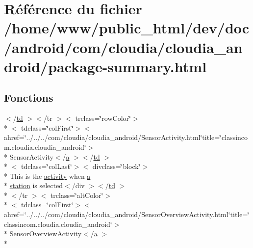 \hypertarget{com_2cloudia_2cloudia__android_2package-summary_8html}{\section{Référence du fichier /home/www/public\-\_\-html/dev/doc/android/com/cloudia/cloudia\-\_\-android/package-\/summary.html}
\label{com_2cloudia_2cloudia__android_2package-summary_8html}
}
\subsection*{Fonctions}
\begin{DoxyCompactItemize}
\item 
$<$/\hyperlink{stylesheet_8css_a2635d454965afd759ce151c6f6d1a04a}{td} $>$$<$/tr $>$$<$ trclass=\char`\"{}row\-Color\char`\"{}$>$\\*
$<$ tdclass=\char`\"{}col\-First\char`\"{}$>$$<$ ahref=\char`\"{}../../../com/cloudia/cloudia\-\_\-android/Sensor\-Activity.\-html\char`\"{}title=\char`\"{}classincom.\-cloudia.\-cloudia\-\_\-android\char`\"{}$>$\\*
 Sensor\-Activity$<$/\hyperlink{style_8css_a5e8981582017bb8b84c21f148345d1f7}{a} $>$$<$/\hyperlink{stylesheet_8css_a2635d454965afd759ce151c6f6d1a04a}{td} $>$\\*
$<$ tdclass=\char`\"{}col\-Last\char`\"{}$>$$<$ divclass=\char`\"{}block\char`\"{}$>$\\*
 This is the \hyperlink{_sensor_activity_8html_a27ce96cb0fb53311961cb30579c7f77e}{activity} when \hyperlink{style_8css_a5e8981582017bb8b84c21f148345d1f7}{a} \\*
\hyperlink{nav__app_8js_a71d7bfaa2081410e47cd5a835af1564d}{station} is selected$<$/div $>$$<$/\hyperlink{stylesheet_8css_a2635d454965afd759ce151c6f6d1a04a}{td} $>$\\*
$<$/tr $>$$<$ trclass=\char`\"{}alt\-Color\char`\"{}$>$\\*
$<$ tdclass=\char`\"{}col\-First\char`\"{}$>$$<$ ahref=\char`\"{}../../../com/cloudia/cloudia\-\_\-android/Sensor\-Overview\-Activity.\-html\char`\"{}title=\char`\"{}classincom.\-cloudia.\-cloudia\-\_\-android\char`\"{}$>$\\*
 Sensor\-Overview\-Activity$<$/\hyperlink{style_8css_a5e8981582017bb8b84c21f148345d1f7}{a} $>$\\*

\end{DoxyCompactItemize}
